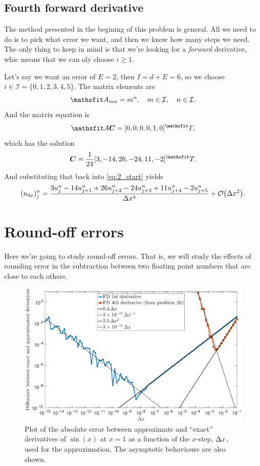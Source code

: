 \documentclass[11pt,letter, swedish, english
]{article}
\begin{document}
\subsection{Fourth forward derivative}
The method presented in the begining of this problem is general. All
we need to do is to pick what error we want, and then we know how many
steps we need. The only thing to keep in mind is that we're looking
for a \emph{forward} derivative, whic means that we can oly choose
$i\ge 1$.

Let's say we want an error of $E=2$, then $I=d+E=6$, so we choose
$i\in\mathcal{I}=\{0, 1, 2, 3, 4, 5\}$. The matrix elements are 
\begin{equation}
\mathsf{A}_{mn}=m^{n}
\qcomma m\in\mathcal{I}\qcomma n\in\mathcal{I}.
\end{equation}
And the matrix equation is
\begin{equation}
\mathsf{A}\vb*{C}=[0, 0, 0, 0, 1, 0]^\mathsf{T},
\end{equation}
which has the solution
\begin{equation}
\vb*{C}=\frac{1}{24} [3, -14, 26, -24, 11, -2]^\mathsf{T}.
\end{equation}
And substituting that back into \eqref{eq:2_start} yields
\begin{equation}
(u_{4x})_j^n=\frac{3u_{j}^n-14u_{j+1}^n+26u_{j+2}^n-24u_{j+3}^n+11u_{j+4}^n-2u_{j+5}^n}{\Dx^4}
+\order{\Dx^2}.
\end{equation}


\section{Round-off errors}
Here we're going to study round-off errors. That is, we will
study the effects of rounding error in the subtraction between two
floating point numbers that are close to each others. 

\begin{figure}\centering
\includegraphics[width=1\textwidth]{3_FD.eps}
\caption{Plot of the absolute error between approximate and ``exact''
  derivatives of $\sin(x)$ at $x=1$ as a function of the $x$-step,
  $\Delta{x}$, used for the approximation. The asymptotic behaviours are
  also shown.}
\label{fig:3_error}
\end{figure}
\end{document}
